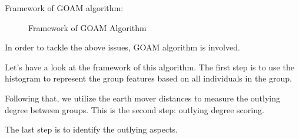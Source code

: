 \documentclass[
 size=14pt,
 paper=smartboard,  %
 mode=present, 		%
 display=slides, 	%
 style=tuliplab,  	%
 pauseslide,
 fleqn,leqno]{powerdot}
\begin{document}
\begin{slide}[toc=,bm=]{}

Framework of GOAM algorithm:

\bigskip

\begin{figure}
  \centering
  \caption{Framework of GOAM Algorithm} \label{framework}
\end{figure}

\begin{note}
In order to tackle the above issues,
GOAM algorithm is involved.

Let's have a look at the framework of this algorithm.
The first step is to use the histogram to represent the group features
based on all individuals in the group.

Following that,
we utilize the earth mover distances to measure the
outlying degree between groups.
This is the second step:
outlying degree scoring.

The last step is to identify the outlying aspects.

\end{note}

\end{slide}
\end{document}
